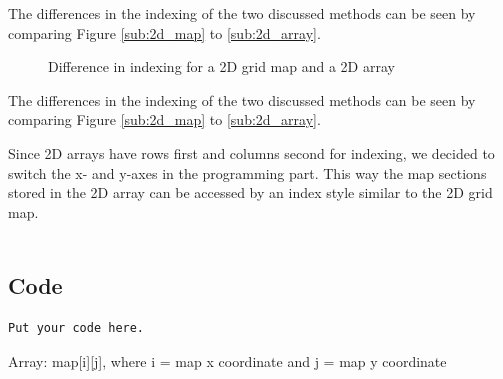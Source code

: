 The differences in the indexing of the two discussed methods can be seen by comparing Figure \ref{sub:2d_map} to \ref{sub:2d_array}.
\begin{figure}[htp]
    \centering
    \hspace{0.05\textwidth}  
    \caption{Difference in indexing for a 2D grid map and a 2D array}
    \label{fig:floor_plans}
\end{figure}
The differences in the indexing of the two discussed methods can be seen by comparing Figure \ref{sub:2d_map} to \ref{sub:2d_array}.

Since 2D arrays have rows first and columns second for indexing, we decided to switch the x- and y-axes in the programming part. This way the map sections stored in the 2D array can be accessed by an index style similar to the 2D grid map.
\\
\\
\subsection*{Code}\label{app:code}

\begin{lstlisting}
Put your code here.
\end{lstlisting}

Array: map[i][j], where i = map x coordinate and j = map y coordinate 

